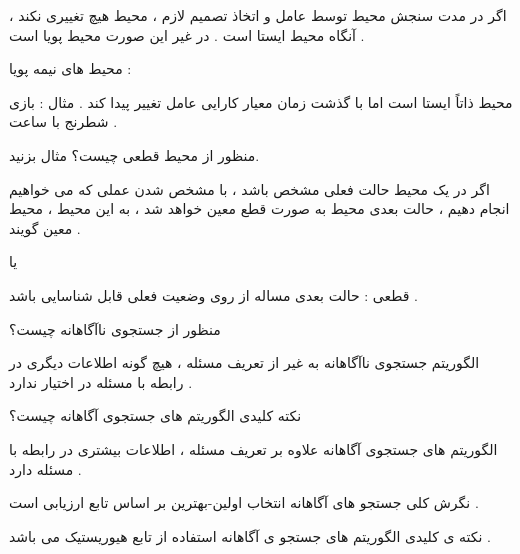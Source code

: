 \documentclass[12pt]{article}
\begin{document}
\begin{tcolorbox}
\noindent
اگر در مدت سنجش محیط توسط عامل و اتخاذ تصمیم لازم ، محیط هیچ تغییری نکند ، آنگاه محیط ایستا است . در غیر این صورت محیط پویا است .

\noindent
محیط های نیمه پویا :

\noindent
محیط ذاتاً ایستا است اما با گذشت زمان معیار کارایی عامل تغییر پیدا کند . مثال : بازی شطرنج با ساعت .
\end{tcolorbox}


\vspace{20pt}
\noindent
منظور از محیط قطعی چیست؟ مثال بزنید.


\begin{tcolorbox}
\noindent
اگر در یک محیط حالت فعلی مشخص باشد ، با مشخص شدن عملی که می خواهیم انجام دهیم ، حالت بعدی محیط به صورت قطع معین خواهد شد ، به این محیط ، محیط معین گویند .

\vspace{20pt}
یا
\vspace{20pt}

\noindent
قطعی
 :
	حالت بعدی مساله از روی وضعیت فعلی قابل شناسایی باشد .
	
\end{tcolorbox}





\newpage
\vspace{20pt}
\noindent
منظور از جستجوی ناآگاهانه چیست؟




\begin{tcolorbox}
الگوریتم جستجوی ناآگاهانه به غیر از تعریف مسئله ، هیچ گونه اطلاعات دیگری در رابطه با مسئله در اختیار ندارد .
\end{tcolorbox}


\vspace{20pt}
\noindent
نکته کلیدی الگوریتم های جستجوی آگاهانه چیست؟




\begin{tcolorbox}
الگوریتم های جستجوی آگاهانه علاوه بر تعریف مسئله ، اطلاعات بیشتری در رابطه با مسئله دارد .


نگرش کلی جستجو های آگاهانه انتخاب اولین-بهترین 
بر اساس تابع ارزیابی است .
\end{tcolorbox}


\begin{tcolorbox}
نکته ی کلیدی الگوریتم های جستجو ی آگاهانه استفاده از تابع هیوریستیک می باشد .
\end{tcolorbox}
\end{document}
